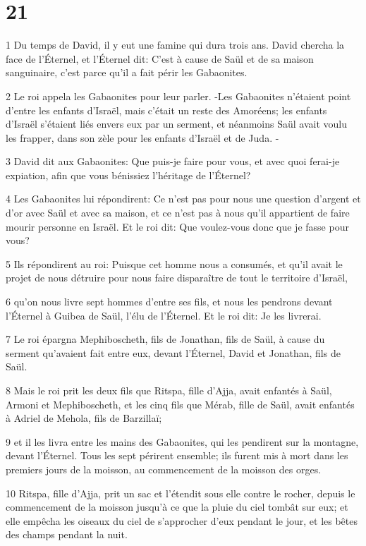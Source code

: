 \chapter{21}

\par 1 Du temps de David, il y eut une famine qui dura trois ans. David chercha la face de l'Éternel, et l'Éternel dit: C'est à cause de Saül et de sa maison sanguinaire, c'est parce qu'il a fait périr les Gabaonites.
\par 2 Le roi appela les Gabaonites pour leur parler. -Les Gabaonites n'étaient point d'entre les enfants d'Israël, mais c'était un reste des Amoréens; les enfants d'Israël s'étaient liés envers eux par un serment, et néanmoins Saül avait voulu les frapper, dans son zèle pour les enfants d'Israël et de Juda. -
\par 3 David dit aux Gabaonites: Que puis-je faire pour vous, et avec quoi ferai-je expiation, afin que vous bénissiez l'héritage de l'Éternel?
\par 4 Les Gabaonites lui répondirent: Ce n'est pas pour nous une question d'argent et d'or avec Saül et avec sa maison, et ce n'est pas à nous qu'il appartient de faire mourir personne en Israël. Et le roi dit: Que voulez-vous donc que je fasse pour vous?
\par 5 Ils répondirent au roi: Puisque cet homme nous a consumés, et qu'il avait le projet de nous détruire pour nous faire disparaître de tout le territoire d'Israël,
\par 6 qu'on nous livre sept hommes d'entre ses fils, et nous les pendrons devant l'Éternel à Guibea de Saül, l'élu de l'Éternel. Et le roi dit: Je les livrerai.
\par 7 Le roi épargna Mephiboscheth, fils de Jonathan, fils de Saül, à cause du serment qu'avaient fait entre eux, devant l'Éternel, David et Jonathan, fils de Saül.
\par 8 Mais le roi prit les deux fils que Ritspa, fille d'Ajja, avait enfantés à Saül, Armoni et Mephiboscheth, et les cinq fils que Mérab, fille de Saül, avait enfantés à Adriel de Mehola, fils de Barzillaï;
\par 9 et il les livra entre les mains des Gabaonites, qui les pendirent sur la montagne, devant l'Éternel. Tous les sept périrent ensemble; ils furent mis à mort dans les premiers jours de la moisson, au commencement de la moisson des orges.
\par 10 Ritspa, fille d'Ajja, prit un sac et l'étendit sous elle contre le rocher, depuis le commencement de la moisson jusqu'à ce que la pluie du ciel tombât sur eux; et elle empêcha les oiseaux du ciel de s'approcher d'eux pendant le jour, et les bêtes des champs pendant la nuit.
